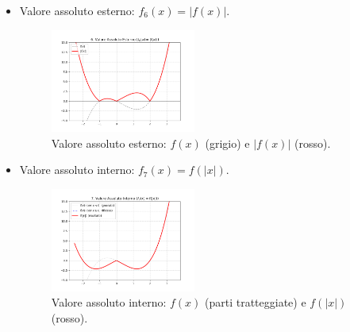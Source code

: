\begin{itemize}
\item Valore assoluto esterno: $f_6(x) = |f(x)|$.
    \begin{figure}[H]
    \centering
    \includegraphics[width=0.45\textwidth]{img/valore_assoluto_esterno.png}
    \caption{Valore assoluto esterno: $f(x)$ (grigio) e $|f(x)|$ (rosso).}
  \end{figure}

\item Valore assoluto interno: $f_7(x) = f(|x|)$.
    \begin{figure}[H]
    \centering
    \includegraphics[width=0.45\textwidth]{img/valore_assoluto_interno.png}
    \caption{Valore assoluto interno: $f(x)$ (parti tratteggiate) e $f(|x|)$ (rosso).}
  \end{figure}
\end{itemize}